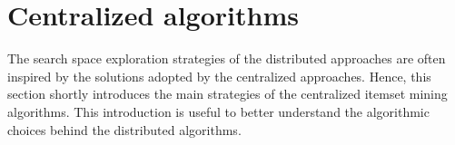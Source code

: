 %
%
%
%
%
%

\section{Centralized algorithms}
\label{survey_centralized}
The search space exploration strategies of the distributed approaches are often inspired by the solutions adopted by the centralized approaches.
Hence, this section shortly introduces the main strategies of the centralized itemset mining algorithms. This introduction is useful to better understand the algorithmic choices behind the distributed algorithms.

